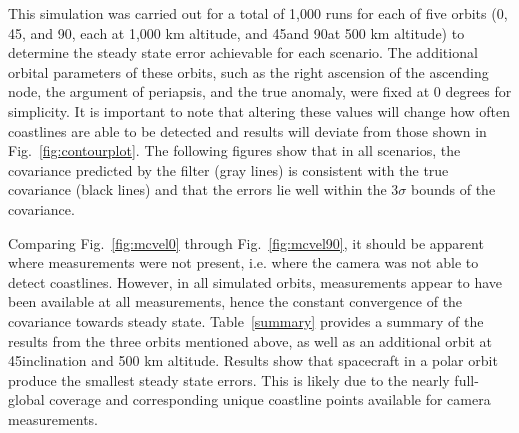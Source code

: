 \documentclass[]{aiaa-tc}%
\begin{document}
This simulation was carried out for a total of 1,000 runs for each of five orbits (0\degree, 45\degree, and 90\degree, each at 1,000 km altitude, and 45\degree and 90\degree at 500 km altitude) to determine the steady state error achievable for each scenario.  The additional orbital parameters of these orbits, such as the right ascension of the ascending node, the argument of periapsis, and the true anomaly, were fixed at 0 degrees for simplicity.  It is important to note that altering these values will change how often coastlines are able to be detected and results will deviate from those shown in Fig.~\ref{fig:contourplot}.  The following figures show that in all scenarios, the covariance predicted by the filter (gray lines) is consistent with the true covariance (black lines) and that the errors lie well within the 3$\sigma$ bounds of the covariance. 

Comparing Fig.~\ref{fig:mcvel0} through Fig.~\ref{fig:mcvel90}, it should be apparent where measurements were not present, i.e. where the camera was not able to detect coastlines.  However, in all simulated orbits, measurements appear to have been available at all measurements, hence the constant convergence of the covariance towards steady state.  Table~\ref{summary} provides a summary of the results from the three orbits mentioned above, as well as an additional orbit at 45\degree inclination and 500 km altitude.  Results show that spacecraft in a polar orbit produce the smallest steady state errors.  This is likely due to the nearly full-global coverage and corresponding unique coastline points available for camera measurements.
\end{document}
